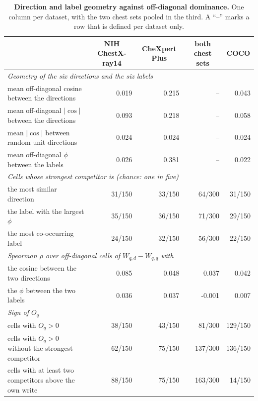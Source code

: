 \documentclass{article}
\begin{document}
\begin{table}[h]
\centering
\scriptsize
\setlength{\tabcolsep}{5pt}
\caption{\textbf{Direction and label geometry against off-diagonal dominance.} One column per dataset, with the two chest sets pooled in the third. A ``--'' marks a row that is defined per dataset only.}
\label{tab:cf-geometry}
\begin{tabular}{lrrrr}
\toprule
& \multicolumn{1}{c}{NIH ChestX-ray14} & \multicolumn{1}{c}{CheXpert Plus} & \multicolumn{1}{c}{both chest sets} & \multicolumn{1}{c}{COCO}\\
\midrule
\multicolumn{5}{l}{\textit{Geometry of the six directions and the six labels}} \\
\quad mean off-diagonal cosine between the directions & 0.019 & 0.215 & -- & 0.043 \\
\quad mean off-diagonal $|\cos|$ between the directions & 0.093 & 0.218 & -- & 0.058 \\
\quad mean $|\cos|$ between random unit directions & 0.024 & 0.024 & -- & 0.024 \\
\quad mean off-diagonal $\phi$ between the labels & 0.026 & 0.381 & -- & 0.022 \\
\midrule
\multicolumn{5}{l}{\textit{Cells whose strongest competitor is (chance: one in five)}} \\
\quad the most similar direction & 31/150 & 33/150 & 64/300 & 31/150 \\
\quad the label with the largest $\phi$ & 35/150 & 36/150 & 71/300 & 29/150 \\
\quad the most co-occurring label & 24/150 & 32/150 & 56/300 & 22/150 \\
\midrule
\multicolumn{5}{l}{\textit{Spearman $\rho$ over off-diagonal cells of $W_{q,d}-W_{q,q}$ with}} \\
\quad the cosine between the two directions & 0.085 & 0.048 & 0.037 & 0.042 \\
\quad the $\phi$ between the two labels & 0.036 & 0.037 & -0.001 & 0.007 \\
\midrule
\multicolumn{5}{l}{\textit{Sign of $O_q$}} \\
\quad cells with $O_q>0$ & 38/150 & 43/150 & 81/300 & 129/150 \\
\quad cells with $O_q>0$ without the strongest competitor & 62/150 & 75/150 & 137/300 & 136/150 \\
\quad cells with at least two competitors above the own write & 88/150 & 75/150 & 163/300 & 14/150 \\
\bottomrule
\end{tabular}
\end{table}
\end{document}
